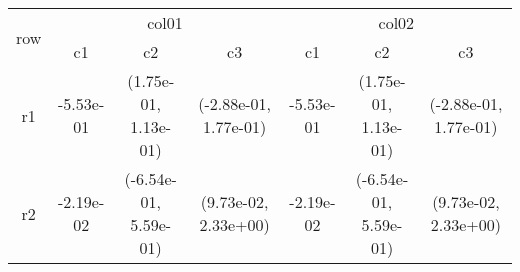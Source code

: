 \begin{tabular}{ccccccc}
\toprule
\multirow{2}{*}{row}&\multicolumn{3}{c}{col01}&\multicolumn{3}{c}{col02}\tabularnewline
\cmidrule(lr){2-4}
\cmidrule(lr){5-7}
&c1&c2&c3&c1&c2&c3\tabularnewline
\midrule
r1&-5.53e-01& (1.75e-01, 1.13e-01)& (-2.88e-01, 1.77e-01)&-5.53e-01& (1.75e-01, 1.13e-01)& (-2.88e-01, 1.77e-01)\tabularnewline
r2&-2.19e-02& (-6.54e-01, 5.59e-01)& (9.73e-02, 2.33e+00)&-2.19e-02& (-6.54e-01, 5.59e-01)& (9.73e-02, 2.33e+00)\tabularnewline
\bottomrule
\end{tabular}

